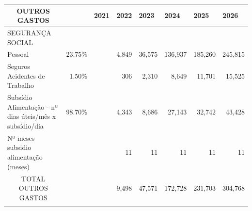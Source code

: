 \documentclass[11pt]{article}
\begin{document}
	\small
	\begin{adjustbox}{center}
		\begin{tabular}{lllrrrrr}
			\hline
			\multicolumn{1}{|c|}{OUTROS GASTOS}                                           & \multicolumn{1}{l|}{}        & \multicolumn{1}{l|}{2021} & \multicolumn{1}{l|}{2022}   & \multicolumn{1}{l|}{2023}    & \multicolumn{1}{l|}{2024}    & \multicolumn{1}{l|}{2025}      & \multicolumn{1}{l|}{2026}      \\ \hline
			\multicolumn{1}{|l|}{SEGURANÇA SOCIAL}                                        & \multicolumn{1}{l|}{}        & \multicolumn{1}{r|}{}     & \multicolumn{1}{r|}{}       & \multicolumn{1}{r|}{}        & \multicolumn{1}{r|}{}        & \multicolumn{1}{r|}{}          & \multicolumn{1}{l|}{}          \\ \hline
			\multicolumn{1}{|l|}{Pessoal}                                                 & \multicolumn{1}{r|}{23.75\%} & \multicolumn{1}{r|}{}     & \multicolumn{1}{r|}{4,849}  & \multicolumn{1}{r|}{36,575}  & \multicolumn{1}{r|}{136,937} & \multicolumn{1}{r|}{185,260}   & \multicolumn{1}{r|}{245,815}   \\ \hline
			\multicolumn{1}{|l|}{Seguros Acidentes de Trabalho}                           & \multicolumn{1}{r|}{1.50\%}  & \multicolumn{1}{r|}{}     & \multicolumn{1}{r|}{306}    & \multicolumn{1}{r|}{2,310}   & \multicolumn{1}{r|}{8,649}   & \multicolumn{1}{r|}{11,701}    & \multicolumn{1}{r|}{15,525}    \\ \hline
			\multicolumn{1}{|l|}{Subsídio Alimentação - nº dias úteis/mês x subsídio/dia} & \multicolumn{1}{r|}{98.70\%} & \multicolumn{1}{l|}{}     & \multicolumn{1}{r|}{4,343}  & \multicolumn{1}{r|}{8,686}   & \multicolumn{1}{r|}{27,143}  & \multicolumn{1}{r|}{32,742}    & \multicolumn{1}{r|}{43,428}    \\ \hline
			\multicolumn{1}{|l|}{Nº meses subsidio alimentação (meses)}                   & \multicolumn{1}{l|}{}        & \multicolumn{1}{l|}{}     & \multicolumn{1}{r|}{11}     & \multicolumn{1}{r|}{11}      & \multicolumn{1}{r|}{11}      & \multicolumn{1}{r|}{11}        & \multicolumn{1}{r|}{11}        \\ \hline
			\multicolumn{1}{|c|}{TOTAL OUTROS GASTOS}                                     & \multicolumn{1}{l|}{}        & \multicolumn{1}{l|}{}     & \multicolumn{1}{r|}{9,498}  & \multicolumn{1}{r|}{47,571}  & \multicolumn{1}{r|}{172,728} & \multicolumn{1}{r|}{231,703}   & \multicolumn{1}{r|}{304,768}   \\ \hline
			\multicolumn{1}{c}{}                                                          &                              &                           & \multicolumn{1}{l}{}        & \multicolumn{1}{l}{}         & \multicolumn{1}{l}{}         & \multicolumn{1}{l}{}           & \multicolumn{1}{l}{}           \\ \hline

\end{tabular}
\end{adjustbox}
\end{document}
